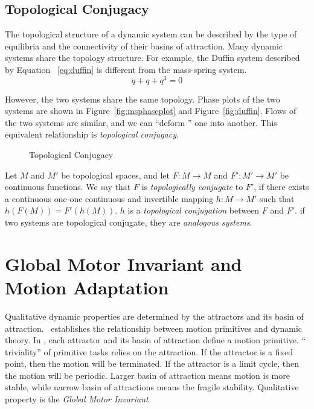 \subsection{Topological Conjugacy}
The topological structure of a dynamic system can be described by the type of equilibria and the connectivity of their basins of attraction.
Many dynamic systems share the topology structure.
For example, the Duffin system described by Equation ~\ref{eq:duffin} is different from the mass-spring system.
\begin{equation}
\label{eq:duffin}
\ddot{q}+q+q^{3}=0
\end{equation}

However, the two systems share the same topology. 
Phase plots of the two systems are shown in Figure~\ref{fig:msphaseplot} and Figure~\ref{fig:duffin}.
Flows of the two systems are similar, and we can ``deform '' one into another.
This equivalent relationship is  \emph{topological conjugacy}.


\begin{figure}[h]
\begin{center}
\end{center}
\caption{Topological Conjugacy}
\label{fig:topconju}
\end{figure}



\begin{mydef}
Let $M$ and $M'$ be topological spaces, and let $F\colon M\to M$ and $F'\colon M'\to M'$
be continuous functions. We say that $F$ is
\emph{topologically conjugate} to $F'$, if there exists a continuous
one-one continuous and invertible mapping $h \colon M\to M'$ such that $h(F(M))=F'(h(M))$.
$h$ is a \emph{topological conjugation} between $F$ and $F'$.
if two systems are topological conjugate, they are \emph{analogous systems}.
\end{mydef}




\section{Global Motor Invariant and Motion Adaptation}
\label{sec:GMIandMA}
Qualitative  dynamic properties are determined by the attractors and its basin of attraction.
\moit\  establishes the relationship between motion primitives and dynamic theory.
In \moit, each attractor and its basin of attraction define a motion primitive.
 `` triviality'' of primitive tasks relies on the attraction.
If the attractor is a fixed point, then the motion will be terminated.
If the attractor is a limit cycle, then the motion will be periodic.
Larger basin of attraction means motion is more stable, while narrow basin of attractions means the fragile stability.
Qualitative property is the \emph{Global Motor Invariant}

